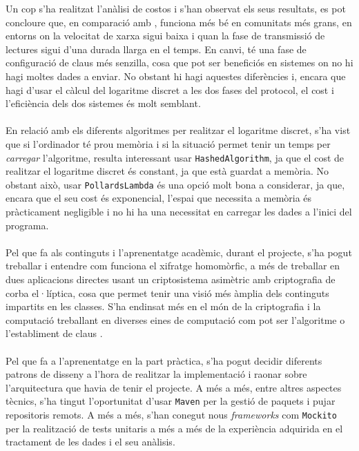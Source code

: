
Un cop s'ha realitzat l'anàlisi de costos i s'han observat els seus resultats, es pot concloure que, en comparació amb \cite{busom}, \cite{recsi} funciona més bé en comunitats més grans, en entorns on la velocitat de xarxa sigui baixa i quan la fase de transmissió de lectures sigui d'una durada llarga en el temps. En canvi, \cite{busom} té una fase de configuració de claus més senzilla, cosa que pot ser beneficiós en sistemes on no hi hagi moltes dades a enviar. No obstant hi hagi aquestes diferències i, encara que \cite{recsi} hagi d'usar el càlcul del logaritme discret a les dos fases del protocol, el cost i l'eficiència dels dos sistemes és molt semblant.
\\
\\
En relació amb els diferents algoritmes per realitzar el logaritme discret, s'ha vist que si l'ordinador té prou memòria i si la situació permet tenir un temps per \textit{carregar} l'algoritme, resulta interessant usar \texttt{HashedAlgorithm}, ja que el cost de realitzar el logaritme discret és constant, ja que està guardat a memòria. No obstant això, usar \texttt{PollardsLambda} és una opció molt bona a considerar, ja que, encara que el seu cost és exponencial, l'espai que necessita a memòria és pràcticament negligible i no hi ha una necessitat en carregar les dades a l'inici del programa.
\\
\\
Pel que fa als continguts i l'aprenentatge acadèmic, durant el projecte, s'ha pogut treballar i entendre com funciona el xifratge homomòrfic, a més de treballar en dues aplicacions directes usant un criptosistema asimètric amb criptografia de corba el·líptica, cosa que permet tenir una visió més àmplia dels continguts impartits en les classes. S'ha endinsat més en el món de la criptografia i la computació treballant en diverses eines de computació com pot ser l'algoritme \cite{kangaroo} o l'establiment de claus \cite{diffie-hellman}.
\\
\\
Pel que fa a l'aprenentatge en la part pràctica, s'ha pogut decidir diferents patrons de disseny a l'hora de realitzar la implementació i raonar sobre l'arquitectura que havia de tenir el projecte. A més a més, entre altres aspectes tècnics, s'ha tingut l'oportunitat d'usar \texttt{Maven} per la gestió de paquets i pujar repositoris remots. A més a més, s'han conegut nous \textit{frameworks} com \texttt{Mockito} per la realització de tests unitaris a més a més de la experiència adquirida en el tractament de les dades i el seu anàlisis.
